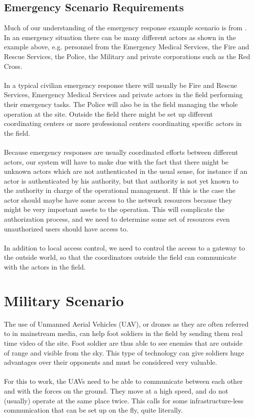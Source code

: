 \subsection{Emergency Scenario Requirements} \label{ems_req}
Much of our understanding of the emergency response example scenario is from \cite{ffi_2005_04015}. In an emergency situation there can be many different actors as shown in the example above, e.g. personnel from the Emergency Medical Services, the Fire and Rescue Services, the Police, the Military and private corporations such as the Red Cross.
\\\\
In a typical civilian emergency response there will usually be Fire and Rescue Services, Emergency Medical Services and private actors in the field performing their emergency tasks. The Police will also be in the field managing the whole operation at the site. Outside the field there might be set up different coordinating centers or more professional centers coordinating specific actors in the field.
\\\\
Because emergency responses are usually coordinated efforts between different actors, our system will have to make due with the fact that there might be unknown actors which are not authenticated in the usual sense, for instance if an actor is authenticated by his authority, but that authority is not yet known to the authority in charge of the operational management. If this is the case the actor should maybe have some access to the network resources because they might be very important assets to the operation. This will complicate the authorization process, and we need to determine some set of resources even unauthorized users should have access to.
\\\\
In addition to local access control, we need to control the access to a gateway to the outside world, so that the coordinators outside the field can communicate with the actors in the field.

\section{Military Scenario}\label{mil_scen}
The use of Unmanned Aerial Vehicles (UAV), or drones as they are often referred to in mainstream media, can help foot soldiers in the field by sending them real time video of the site. Foot soldier are thus able to see enemies that are outside of range and visible from the sky. This type of technology can give soldiers huge advantages over their opponents and must be considered very valuable.
\\\\
For this to work, the UAVs need to be able to communicate between each other and with the forces on the ground. They move at a high speed, and do not (usually) operate at the same place twice. This calls for some infrastructure-less communication that can be set up on the fly, quite literally.

